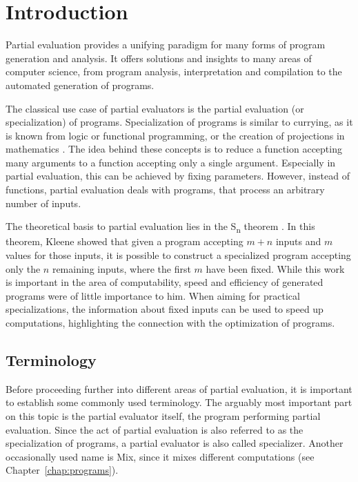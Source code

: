 
\newcommand{\smn}[0]{S\rlap{\textsuperscript{m}}\textsubscript{n}{ }}

\section{Introduction}\label{sec:introduction}

Partial evaluation provides a unifying paradigm for many forms of program generation and analysis.
It offers solutions and insights to many areas of computer science, from program analysis, interpretation and compilation to the automated generation of programs.

The classical use case of partial evaluators is the partial evaluation (or specialization) of programs.
Specialization of programs is similar to currying, as it is known from logic or functional programming, or the creation of projections in mathematics .
The idea behind these concepts is to reduce a function accepting many arguments to a function accepting only a single argument.
Especially in partial evaluation, this can be achieved by fixing parameters.
However, instead of functions, partial evaluation deals with programs, that process an arbitrary number of inputs.

The theoretical basis to partial evaluation lies in the \smn{} theorem .
In this theorem, Kleene showed that given a program accepting $m + n$ inputs and $m$ values for those inputs, it is possible to construct a specialized program accepting only the $n$ remaining inputs, where the first $m$ have been fixed.
While this work is important in the area of computability, speed and efficiency of generated programs were of little importance to him.
When aiming for practical specializations, the information about fixed inputs can be used to speed up computations, highlighting the connection with the optimization of programs.


\subsection{Terminology}

Before proceeding further into different areas of partial evaluation, it is important to establish some commonly used terminology.
The arguably most important part on this topic is the partial evaluator itself, the program performing partial evaluation.
Since the act of partial evaluation is also referred to as the specialization of programs, a partial evaluator is also called specializer.
Another occasionally used name is Mix, since it mixes different computations (see Chapter~\ref{chap:programs}).

